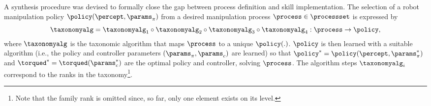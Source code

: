 A synthesis procedure was devised to formally close the gap between process definition and skill implementation.
The selection of a robot manipulation policy $\policy (\percept,\params_\pi)$ from a desired manipulation process $\process \in \processset$ is expressed by
\begin{equation*}
    \taxonomyalg = \taxonomyalg_1 \circ \taxonomyalg_2  \circ \taxonomyalg_3  \circ \taxonomyalg_4 : \process \rightarrow \policy,
\end{equation*}
where $\taxonomyalg$ is the taxonomic algorithm that maps $\process$ to a unique $\policy(.)$.
$\policy$ is then learned with a suitable algorithm (i.e., the policy and controller parameters $(\params_\pi,\params_c)$ are learned) so that $\policy^* = \policy (\percept,\params_\pi^*)$ and $\torqued^* = \torqued (\params_c^*)$ are the optimal policy and controller, solving $\process$. The algorithm steps $\taxonomyalg_i$ correspond to the ranks in the taxonomy\footnote{Note that the family rank is omitted since, so far, only one element exists on its level.}.

